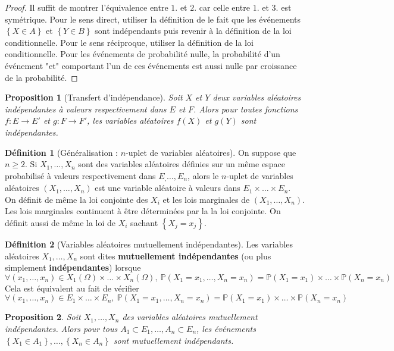 \documentclass[french]{book}
\renewcommand{\P}{\mathbb{P}}
\theoremstyle{plain}
\newtheorem{prop}{Proposition}[chapter]
\theoremstyle{definition}
\newtheorem{dfn}{Définition}[chapter]
\theoremstyle{remark}
\begin{document}
\begin{proof}
	Il suffit de montrer l'équivalence entre $1.$ et $2.$ car celle entre $1.$ et $3.$ est symétrique. Pour le sens direct, utiliser la définition de le fait que les événements $\left\{X\in A\right\}$ et $\left\{Y\in B\right\}$ sont indépendants puis revenir à la définition de la loi conditionnelle. Pour le sens réciproque, utiliser la définition de la loi conditionnelle. Pour les événements de probabilité nulle, la probabilité d'un événement "et" comportant l'un de ces événements est aussi nulle par croissance de la probabilité.
\end{proof}
\begin{prop}[Transfert d'indépendance]
	Soit $X$ et $Y$ deux variables aléatoires indépendantes à valeurs respectivement dans $E$ et $F$. Alors pour toutes fonctions $f:E\rightarrow E'$ et $g:F\rightarrow F'$, les variables aléatoires $f(X)$ et $g(Y)$ sont indépendantes.
\end{prop}
\begin{dfn}[Généralisation : $n$-uplet de variables aléatoires]
	On suppose que $n\geqslant2$. Si $X_1,\ldots,X_n$ sont des variables aléatoires définies sur un même espace probabilisé à valeurs respectivement dans $E_,\ldots,E_n$, alors le $n$-uplet de variables aléatoires $(X_1,\ldots,X_n)$ est une variable aléatoire à valeurs dans $E_1\times\ldots\times E_n$. \\ On définit de même la loi conjointe des $X_i$ et les lois marginales de $(X_1,\ldots,X_n)$. Les lois marginales continuent à être déterminées par la la loi conjointe. On définit aussi de même la loi de $X_i$ sachant $\left\{X_j=x_j\right\}$.
\end{dfn}
\begin{dfn}[Variables aléatoires mutuellement indépendantes]
	Les variables aléatoires $X_1,\ldots,X_n$ sont dites \textbf{mutuellement indépendantes} (ou plus simplement \textbf{indépendantes}) lorsque $$\forall(x_1,\ldots,x_n)\in X_1(\Omega)\times\ldots\times X_n(\Omega), \ \P(X_1=x_1,\ldots,X_n=x_n)=\P(X_1=x_1)\times\ldots\times\P(X_n=x_n)$$ Cela est équivalent au fait de vérifier$$\forall(x_1,\ldots,x_n)\in E_1\times\ldots\times E_n, \ \P(X_1=x_1,\ldots,X_n=x_n)=\P(X_1=x_1)\times\ldots\times\P(X_n=x_n)$$
\end{dfn}
\begin{prop}
	Soit $X_1,\ldots,X_n$ des variables aléatoires mutuellement indépendantes. Alors pour tous $A_1\subset E_1,\ldots,A_n\subset E_n$, les événements $\left\{X_1\in A_1\right\},\ldots,\left\{X_n\in A_n\right\}$ sont mutuellement indépendants.
\end{prop}
\end{document}
